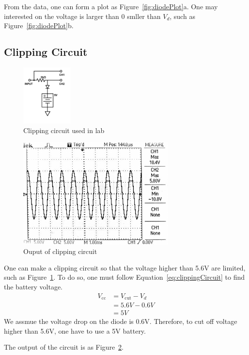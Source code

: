 \documentclass[aps,prl,reprint]{revtex4-1}
\newcommand{\vcc}{V_\text{cc}}
\begin{document}
    From the data, one can form a plot as Figure~\ref{fig:diodePlot}a. One may interested on the voltage is larger than 0 smller than $V_d$, such as Figure~\ref{fig:diodePlot}b.

    \subsection{Clipping Circuit}
    \begin{figure}[b]
        \centering
        \includegraphics[height=1.2in]{image/Clipping-Circuit-Lab.pdf}
        \caption{Clipping circuit used in lab}
        \label{fig:clippingCircuitLab}
    \end{figure}
    \begin{figure}[b]
        \centering
        \includegraphics[height=2.2in]{image/Clipping-Scope}
        \caption{Ouput of clipping circuit}
        \label{fig:ClippingScope}
    \end{figure}
    One can make a clipping circuit so that the voltage higher than 5.6V are limited, such as Figure~\ref{fig:clippingCircuitLab}. To do so, one must follow Equation~\ref{eq:clippingCircuit} to find the battery voltage. 
    \begin{align*}
        \vcc &= V_\text{cut} - V_d\\
             &= 5.6V - 0.6V\\
             &= 5V
    \end{align*}
    We assmue the voltage drop on the diode is 0.6V. Therefore, to cut off voltage higher than 5.6V, one have to use a 5V battery. 

    The output of the circuit is as Figure~\ref{fig:ClippingScope}.
\end{document}
